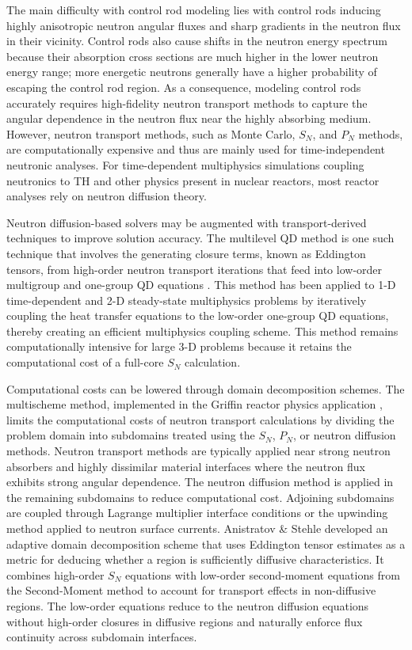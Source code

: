 The main difficulty with control rod modeling lies with control rods inducing highly anisotropic
neutron angular fluxes and sharp gradients in the neutron flux in their vicinity. Control rods also
cause shifts in the neutron energy spectrum because their absorption cross sections are much higher
in the lower neutron energy range; more energetic neutrons generally have a higher probability of
escaping the control rod region. As a consequence, modeling control rods accurately requires
high-fidelity neutron transport methods to capture the angular dependence in the neutron flux near
the highly absorbing medium. However, neutron transport methods, such as Monte Carlo, $S_N$, and
$P_N$ methods, are computationally expensive and thus are mainly used for time-independent
neutronic analyses. For time-dependent multiphysics
simulations coupling neutronics to \gls{TH} and other physics present in nuclear reactors, most
reactor analyses rely on neutron diffusion theory.

Neutron diffusion-based solvers may be augmented with transport-derived techniques to improve
solution accuracy. The multilevel \gls{QD} method is one such technique that involves the
generating closure terms, known as Eddington tensors, from high-order neutron transport iterations
that feed into low-order multigroup and one-group \gls{QD} equations
\cite{goldin_quasi-diffusion_1964, anistratov_solution_1986}. This method has been applied to 1-D
time-dependent and 2-D steady-state multiphysics problems \cite{tamang_multilevel_2014,
reynolds_analysis_2023} by iteratively coupling the heat transfer equations to the low-order
one-group \gls{QD} equations, thereby creating an efficient multiphysics coupling scheme. This
method remains computationally intensive for large 3-D problems because it retains the
computational cost of a full-core $S_N$ calculation.

Computational costs can be lowered through domain decomposition schemes.
The multischeme method, implemented in the Griffin reactor physics application
\cite{yang_development_2022}, limits the computational costs of neutron transport calculations
by dividing the problem domain
into subdomains treated using the $S_N$, $P_N$, or neutron diffusion methods. Neutron transport
methods are typically applied near strong neutron absorbers and highly dissimilar material
interfaces where the neutron flux exhibits strong angular dependence. The neutron diffusion method
is applied in the remaining subdomains to reduce computational cost. Adjoining subdomains are
coupled through
Lagrange multiplier interface conditions or the upwinding method applied to neutron surface
currents. Anistratov \& Stehle \cite{anistratov_computational_2012} developed an adaptive domain
decomposition scheme that uses Eddington tensor estimates as a metric for deducing whether a region
is sufficiently diffusive characteristics. It combines high-order $S_N$ equations with low-order
second-moment equations from the Second-Moment method \cite{lewis_comparison_1976} to account for
transport effects in non-diffusive regions. The low-order equations reduce to the neutron diffusion
equations without high-order closures in diffusive regions and naturally enforce flux continuity
across subdomain interfaces.

